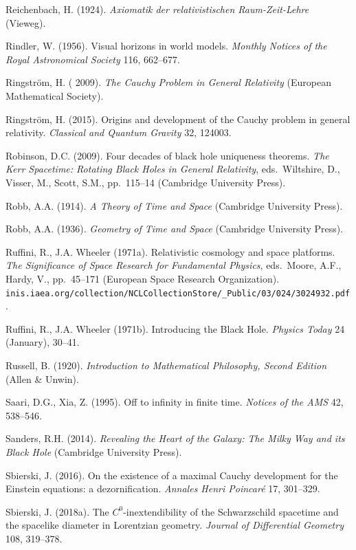 \documentclass[11pt,a4paper]{article}
\begin{document}
\begin{small}
\begin{thebibliography}{99}
      \item[]  Reichenbach, H. (1924). \emph{Axiomatik der relativistischen Raum-Zeit-Lehre} (Vieweg). 
       \item[]  Rindler, W. (1956). Visual horizons in world models. \emph{Monthly Notices of the Royal Astronomical
Society} 116,  662--677.
      \item[]  Ringstr\"{o}m, H.  ( 2009). \emph{The Cauchy Problem in General Relativity} (European Mathematical Society). 
      \item[]  Ringstr\"{o}m, H. (2015). Origins and development of the Cauchy problem in general relativity.
\emph{Classical and Quantum Gravity} 32, 124003.
 \item[] Robinson, D.C. (2009). Four decades of black hole uniqueness theorems. \emph{The Kerr Spacetime: Rotating Black Holes in General Relativity}, eds.\ Wiltshire, D., Visser, M., Scott, S.M., pp.\ 115--14 (Cambridge University Press).
 \item[]  Robb, A.A. (1914).   \emph{A Theory  of Time and Space} (Cambridge University Press). 
 \item[]  Robb, A.A. (1936). \emph{Geometry of Time and Space} (Cambridge University Press). 
       \item[] Ruffini, R.,  J.A. Wheeler (1971a). Relativistic cosmology and space platforms.
     \emph{The Significance
of Space Research for Fundamental Physics}, eds.\  Moore, A.F.,  Hardy, V., pp.\
45--171 (European Space Research Organization). \verb#inis.iaea.org/collection/NCLCollectionStore/_Public/03/024/3024932.pdf#.
         \item[] Ruffini, R.,  J.A. Wheeler (1971b).  Introducing the Black Hole. \emph{Physics Today} 24
(January), 30--41.
        \item[] Russell, B. (1920). \emph{Introduction to Mathematical Philosophy, Second Edition} (Allen \& Unwin).
         \item[] Saari, D.G., Xia, Z.  (1995). Off to infinity in finite time. \emph{Notices of the AMS} 42, 538--546. 
        \item[] Sanders, R.H. (2014). \emph{Revealing the Heart of the Galaxy: The Milky Way and its Black Hole} (Cambridge University Press).      
\item[] Sbierski, J. (2016). On the existence of a maximal Cauchy development for the Einstein equations: a dezornification.
\emph{Annales Henri Poincar\'{e}} 17, 301--329. 
\item[] Sbierski, J. (2018a). The $C^0$-inextendibility of the Schwarzschild spacetime and the spacelike diameter in Lorentzian geometry. \emph{Journal of Differential Geometry}  108, 319--378. 

\end{thebibliography}
\end{small}
\end{document}
